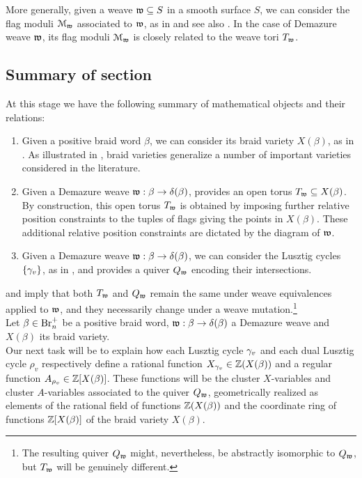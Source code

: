 \begin{remark}
More generally, given a weave $\mathfrak{w}\subseteq S$ in a smooth surface $S$, we can consider the flag moduli $\mathcal{M}_{\mathfrak{w}}$ associated to $\mathfrak{w}$, as in \cite[Section 5.2]{CasalsZaslow} and see also \cite[Section 5.1]{CGGJ24}. In the case of Demazure weave $\mathfrak{w}$, its flag moduli $\mathcal{M}_{\mathfrak{w}}$ is closely related to the weave tori $T_{\mathfrak{w}}$.\sbs
\end{remark}

\subsection{Summary of section}\label{ssec:summary_braid varieties} At this stage we have the following summary of mathematical objects and their relations:
\begin{enumerate}
    \item Given a positive braid word $\beta$, we can consider its braid variety $X(\beta)$, as in . As illustrated in , braid varieties generalize a number of important varieties considered in the literature.\\
    
    \item Given a Demazure weave $\mathfrak{w}:\beta\to\delta(\beta)$,  provides an open torus $T_{\mathfrak{w}}\subseteq X(\beta)$. By construction, this open torus $T_{\mathfrak{w}}$ is obtained by imposing further relative position constraints to the tuples of flags giving the points in $X(\beta)$. These additional relative position constraints are dictated by the diagram of $\mathfrak{w}$.\\

    \item Given a Demazure weave $\mathfrak{w}:\beta\to\delta(\beta)$, we can consider the Lusztig cycles $\{\gamma_v\}$, as in , and  provides a quiver $Q_{\mathfrak{w}}$ encoding their intersections.\\
\end{enumerate} 
 and  imply that both $T_{\mathfrak{w}}$ and $Q_{\mathfrak{w}}$ remain the same under weave equivalences applied to $\mathfrak{w}$, and they necessarily change under a weave mutation.\footnote{The resulting quiver $Q_{\mathfrak{w}}$ might, nevertheless, be abstractly isomorphic to $Q_{\mathfrak{w}}$, but $T_{\mathfrak{w}}$ will be genuinely different.}\\

Let $\beta\in\text{Br}_n^+$ be a positive braid word, $\mathfrak{w}:\beta\to\delta(\beta)$ a Demazure weave and $X(\beta)$ its braid variety.\\

\noindent Our next task will be to explain how each Lusztig cycle $\gamma_v$ and each dual Lusztig cycle $\rho_v$ respectively define a rational function $X_{\gamma_v}\in\mathbb{Z}(X(\beta))$ and a regular function $A_{\rho_v}\in\mathbb{Z}[X(\beta)]$. These functions will be the cluster $X$-variables and cluster $A$-variables associated to the quiver $Q_{\mathfrak{w}}$, geometrically realized as elements of the rational field of functions $\mathbb{Z}(X(\beta))$ and the coordinate ring of functions $\mathbb{Z}[X(\beta)]$ of the braid variety $X(\beta)$.

